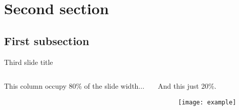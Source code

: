 \section{Second section}
\subsection{First subsection}

\begin{frame}{Third slide title}
	\begin{columns}
		\begin{column}{0.8\textwidth}
			This column occupy 80\% of the slide width...
			\pause
		\end{column}
		\begin{column}{0.2\textwidth}
			And this just 20\%.\\
			\begin{figure}
				\centering
				\texttt{[image: example]}
			\end{figure}
		\end{column}
	\end{columns}
\end{frame}
